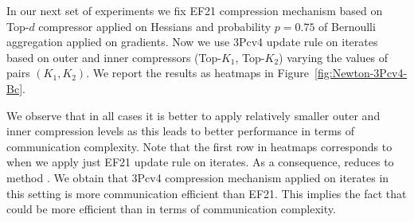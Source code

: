 \documentclass[11pt]{article}
\begin{document}
	In our next set of experiments we fix EF21 compression mechanism based on Top-$d$ compressor applied on Hessians and probability $p=0.75$ of Bernoulli aggregation applied on gradients. Now we use 3Pcv4 update rule on iterates based on outer and inner compressors (Top-$K_1$, Top-$K_2$) varying the values of pairs $(K_1, K_2)$. We report the results as heatmaps in Figure~\ref{fig:Newton-3Pcv4-Bc}.
	
	
	We observe that in all cases it is better to apply relatively smaller outer and inner compression levels as this leads to better performance in terms of communication complexity. Note that the first row in heatmaps corresponds to  when we apply just EF21 update rule on iterates. As a consequence,  reduces to  method \citep{FedNL2021}. We obtain that 3Pcv4 compression mechanism applied on iterates in this setting is more communication efficient than EF21. This implies the fact that  could be more efficient than  in terms of communication complexity.
	
\end{document}
